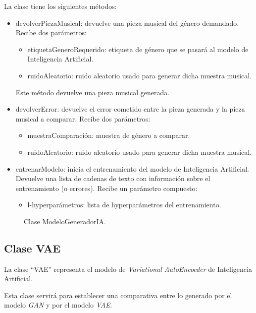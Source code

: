 La clase tiene los siguientes métodos:

\begin{itemize}
    \item devolverPiezaMusical: devuelve una pieza musical del género demandado. Recibe dos parámetros:
    \begin{itemize}
        \item etiquetaGeneroRequerido: etiqueta de género que se pasará al modelo de Inteligencia Artificial.
        \item ruidoAleatorio: ruido aleatorio usado para generar dicha muestra musical.
    \end{itemize}
    Este método devuelve una pieza musical generada.
    \item devolverError: devuelve el error cometido entre la pieza generada y la pieza musical a comparar. Recibe dos parámetros:
    \begin{itemize}
        \item muestraComparación: muestra de género a comparar.
        \item ruidoAleatorio: ruido aleatorio usado para generar dicha muestra musical.
    \end{itemize}
    \item entrenarModelo: inicia el entrenamiento del modelo de Inteligencia Artificial. Devuelve una lista de cadenas de texto con información sobre el entrenamiento (o errores). Recibe un parámetro compuesto:
    \begin{itemize}
        \item l-hyperparámetros: lista de hyperparámetros del entrenamiento.
    \end{itemize}
\end{itemize}

\begin{figure}[H]
  \centering
  
  \caption{Clase ModeloGeneradorIA.}
\end{figure}


\subsection{Clase VAE}

La clase ``VAE'' representa el modelo de \emph{Variational AutoEncocder} de Inteligencia Artificial.

Esta clase servirá para establecer una comparativa entre lo generado por el modelo \emph{GAN} y por el modelo \emph{VAE}.

